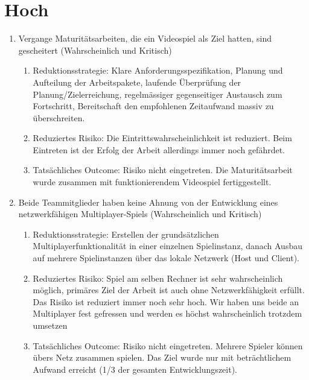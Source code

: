 \section{Hoch}
\begin{enumerate}
    \item Vergange Maturitätsarbeiten, die ein Videospiel als Ziel hatten, sind gescheitert (Wahrscheinlich und Kritisch)
    \begin{enumerate}
        \item Reduktionsstrategie: Klare Anforderungsspezifikation, Planung und Aufteilung der Arbeitspakete, laufende Überprüfung der Planung/Zielerreichung, regelmässiger gegenseitiger Austausch zum Fortschritt,
        Bereitschaft den empfohlenen Zeitaufwand massiv zu überschreiten.
        \item Reduziertes Risiko: Die Eintrittswahrscheinlichkeit ist reduziert. Beim Eintreten ist der Erfolg der Arbeit allerdings immer noch gefährdet.
        \item Tatsächliches Outcome: Risiko nicht eingetreten. Die Maturitätsarbeit wurde zusammen mit funktionierendem Videospiel fertiggestellt.
    \end{enumerate}

    \item Beide Teammitglieder haben keine Ahnung von der Entwicklung eines netzwerkfähigen Multiplayer-Spiels (Wahrscheinlich und Kritisch)
    \begin{enumerate}
        \item Reduktionsstrategie: Erstellen der grundsätzlichen Multiplayerfunktionalität in einer einzelnen Spielinstanz, danach Ausbau auf mehrere Spielinstanzen über das lokale Netzwerk (Host und Client).
        \item Reduziertes Risiko: Spiel am selben Rechner ist sehr wahrscheinlich möglich, primäres Ziel der Arbeit ist auch ohne Netzwerkfähigkeit erfüllt.
            Das Risiko ist reduziert immer noch sehr hoch.
            Wir haben uns beide an Multiplayer fest gefressen und werden es höchst wahrscheinlich trotzdem umsetzen
        \item Tatsächliches Outcome: Risiko nicht eingetreten. Mehrere Spieler können übers Netz zusammen spielen. Das Ziel wurde nur mit beträchtlichem Aufwand erreicht (1/3 der gesamten Entwicklungszeit).
    \end{enumerate}


\end{enumerate}

